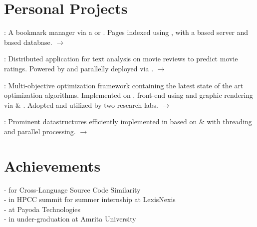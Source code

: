 \documentclass[]{bigfatnoob-resume}
\begin{document}
\begin{minipage}[t]{0.33\textwidth}

\section{Personal Projects}
\href{http://Region.io}{}: A bookmark manager via a  or . Pages indexed using , with a  based server and  based database. $\rightarrow$ \href{http://region.io}{} \vspace{1mm}


\href{https://github.com/NCSU-Advanced-Algos/octorater}{}: Distributed application for text analysis on movie reviews to predict movie ratings. Powered by  and parallelly deployed via . $\rightarrow$ \href{https://github.com/NCSU-Advanced-Algos/octorater}{} \vspace{1mm}


\href{https://github.com/bigfatnoob/optima}{}: Multi-objective optimization framework containing the latest state of the art optimization algorithms. Implemented on , front-end using  and graphic rendering via  \& . Adopted and utilized by two research labs. $\rightarrow$  \href{https://github.com/bigfatnoob/optima}{} \vspace{1mm}

\href{https://github.com/dr-bigfatnoob/collections}{}: Prominent datastructures efficiently implemented in  based on  \&  with threading and parallel processing. $\rightarrow$\href{https://github.com/dr-bigfatnoob/collections}{}\\
\sectionsep

\section{Achievements}
-  for Cross-Language Source Code Similarity \\
-  in HPCC summit for summer internship at LexisNexis \\
-  at Payoda Technologies \\ 
-  in under-graduation at Amrita University \\


\end{minipage}
\end{document}
